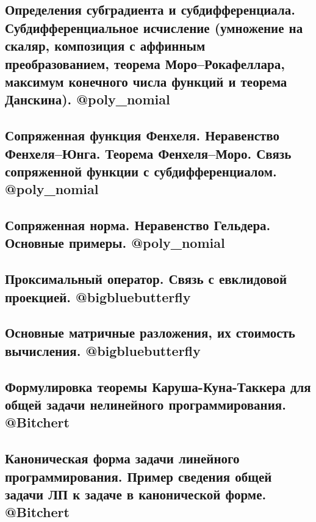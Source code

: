 \documentclass[a4paper, 16pt]{article}
\begin{document}
    
    
    \subsection{Определения субградиента и субдифференциала. Субдифференциальное исчисление (умножение на скаляр, композиция с аффинным преобразованием, теорема Моро–Рокафеллара, максимум конечного числа функций и теорема Данскина). @poly\_nomial}

    

    \subsection{Сопряженная функция Фенхеля. Неравенство Фенхеля–Юнга. Теорема Фенхеля–Моро. Связь сопряженной функции с субдифференциалом. @poly\_nomial}

    

    \subsection{Сопряженная норма. Неравенство Гельдера. Основные примеры. @poly\_nomial}

    

    \subsection{Проксимальный оператор. Связь с евклидовой проекцией. @bigbluebutterfly}

    

    \subsection{Основные матричные разложения, их стоимость вычисления. @bigbluebutterfly}

    

    \subsection{Формулировка теоремы Каруша-Куна-Таккера для общей задачи нелинейного программирования. @Bitchert}
    
    
    
    \subsection{Каноническая форма задачи линейного программирования. Пример сведения общей задачи ЛП к задаче в канонической форме. @Bitchert}
    
\end{document}
